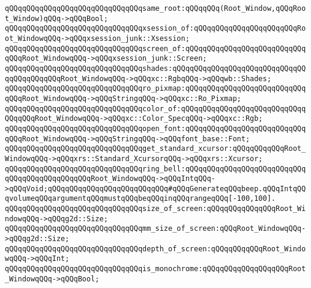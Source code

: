 \newline
\newline
\verb|qQQqqQQqqQQqqQQqqQQqqQQqqQQqqQQqsame_root:qQQqqQQq(Root_Window,qQQqRoot_Window)qQQq->qQQqBool;|\newline
\newline
\verb|qQQqqQQqqQQqqQQqqQQqqQQqqQQqqQQqxsession_of:qQQqqQQqqQQqqQQqqQQqqQQqRoot_WindowqQQq->qQQqxsession_junk::Xsession;|\newline
\verb|qQQqqQQqqQQqqQQqqQQqqQQqqQQqqQQqscreen_of:qQQqqQQqqQQqqQQqqQQqqQQqqQQqqQQqRoot_WindowqQQq->qQQqxsession_junk::Screen;|\newline
\verb|qQQqqQQqqQQqqQQqqQQqqQQqqQQqqQQqshades:qQQqqQQqqQQqqQQqqQQqqQQqqQQqqQQqqQQqqQQqqQQqRoot_WindowqQQq->qQQqxc::RgbqQQq->qQQqwb::Shades;|\newline
\newline
\verb|qQQqqQQqqQQqqQQqqQQqqQQqqQQqqQQqro_pixmap:qQQqqQQqqQQqqQQqqQQqqQQqqQQqqQQqRoot_WindowqQQq->qQQqStringqQQq->qQQqxc::Ro_Pixmap;|\newline
\verb|qQQqqQQqqQQqqQQqqQQqqQQqqQQqqQQqcolor_of:qQQqqQQqqQQqqQQqqQQqqQQqqQQqqQQqqQQqRoot_WindowqQQq->qQQqxc::Color_SpecqQQq->qQQqxc::Rgb;|\newline
\verb|qQQqqQQqqQQqqQQqqQQqqQQqqQQqqQQqopen_font:qQQqqQQqqQQqqQQqqQQqqQQqqQQqqQQqRoot_WindowqQQq->qQQqStringqQQq->qQQqfont_base::Font;|\newline
\newline
\verb|qQQqqQQqqQQqqQQqqQQqqQQqqQQqqQQqget_standard_xcursor:qQQqqQQqqQQqRoot_WindowqQQq->qQQqxrs::Standard_XcursorqQQq->qQQqxrs::Xcursor;|\newline
\newline
\verb|qQQqqQQqqQQqqQQqqQQqqQQqqQQqqQQqring_bell:qQQqqQQqqQQqqQQqqQQqqQQqqQQqqQQqqQQqqQQqqQQqqQQqRoot_WindowqQQq->qQQqIntqQQq->qQQqVoid;qQQqqQQqqQQqqQQqqQQqqQQqqQQq#qQQqGenerateqQQqbeep.qQQqIntqQQqvolumeqQQqargumentqQQqmustqQQqbeqQQqinqQQqrangeqQQq[-100,100].|\newline
\newline
\verb|qQQqqQQqqQQqqQQqqQQqqQQqqQQqqQQqsize_of_screen:qQQqqQQqqQQqqQQqRoot_WindowqQQq->qQQqg2d::Size;|\newline
\verb|qQQqqQQqqQQqqQQqqQQqqQQqqQQqqQQqmm_size_of_screen:qQQqRoot_WindowqQQq->qQQqg2d::Size;|\newline
\verb|qQQqqQQqqQQqqQQqqQQqqQQqqQQqqQQqdepth_of_screen:qQQqqQQqqQQqRoot_WindowqQQq->qQQqInt;|\newline
\newline
\verb|qQQqqQQqqQQqqQQqqQQqqQQqqQQqqQQqis_monochrome:qQQqqQQqqQQqqQQqqQQqRoot_WindowqQQq->qQQqBool;|\newline
